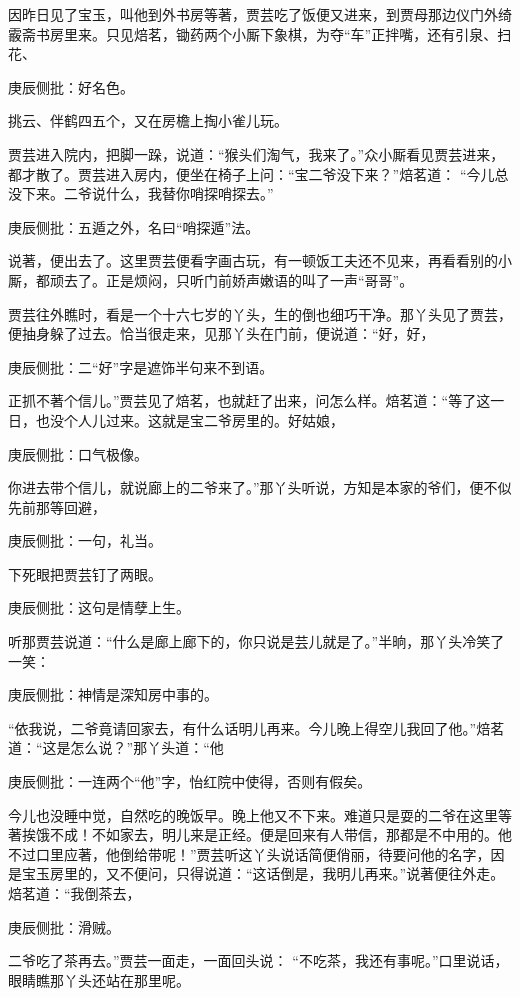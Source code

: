 \begin{parag}


    因昨日见了宝玉，叫他到外书房等著，贾芸吃了饭便又进来，到贾母那边仪门外绮霰斋书房里来。只见焙茗，锄药两个小厮下象棋，为夺“车”正拌嘴，还有引泉、扫花、\begin{note}庚辰侧批：好名色。\end{note}挑云、伴鹤四五个，又在房檐上掏小雀儿玩。
\end{parag}


\begin{parag}


    贾芸进入院内，把脚一跺，说道：“猴头们淘气，我来了。”众小厮看见贾芸进来，都才散了。贾芸进入房内，便坐在椅子上问：“宝二爷没下来？”焙茗道： “今儿总没下来。二爷说什么，我替你哨探哨探去。”\begin{note}庚辰侧批：五遁之外，名曰“哨探遁”法。\end{note}说著，便出去了。这里贾芸便看字画古玩，有一顿饭工夫还不见来，再看看别的小厮，都顽去了。正是烦闷，只听门前娇声嫩语的叫了一声“哥哥”。
\end{parag}


\begin{parag}


    贾芸往外瞧时，看是一个十六七岁的丫头，生的倒也细巧干净。那丫头见了贾芸，便抽身躲了过去。恰当很走来，见那丫头在门前，便说道：“好，好，\begin{note}庚辰侧批：二“好”字是遮饰半句来不到语。\end{note}正抓不著个信儿。”贾芸见了焙茗，也就赶了出来，问怎么样。焙茗道：“等了这一日，也没个人儿过来。这就是宝二爷房里的。好姑娘，\begin{note}庚辰侧批：口气极像。\end{note}你进去带个信儿，就说廊上的二爷来了。”那丫头听说，方知是本家的爷们，便不似先前那等回避，\begin{note}庚辰侧批：一句，礼当。\end{note}下死眼把贾芸钉了两眼。\begin{note}庚辰侧批：这句是情孽上生。\end{note}听那贾芸说道：“什么是廊上廊下的，你只说是芸儿就是了。”半晌，那丫头冷笑了一笑：\begin{note}庚辰侧批：神情是深知房中事的。\end{note}“依我说，二爷竟请回家去，有什么话明儿再来。今儿晚上得空儿我回了他。”焙茗道：“这是怎么说？”那丫头道：“他\begin{note}庚辰侧批：一连两个“他”字，怡红院中使得，否则有假矣。\end{note}今儿也没睡中觉，自然吃的晚饭早。晚上他又不下来。难道只是耍的二爷在这里等著挨饿不成！不如家去，明儿来是正经。便是回来有人带信，那都是不中用的。他不过口里应著，他倒给带呢！”贾芸听这丫头说话简便俏丽，待要问他的名字，因是宝玉房里的，又不便问，只得说道：“这话倒是，我明儿再来。”说著便往外走。焙茗道：“我倒茶去，\begin{note}庚辰侧批：滑贼。\end{note}二爷吃了茶再去。”贾芸一面走，一面回头说： “不吃茶，我还有事呢。”口里说话，眼睛瞧那丫头还站在那里呢。
\end{parag}



